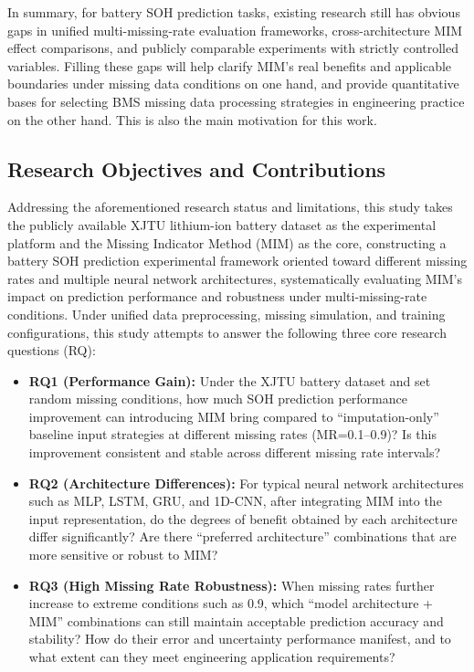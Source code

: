 \documentclass[10pt,a4paper]{article}
\begin{document}
In summary, for battery SOH prediction tasks, existing research still has obvious gaps in unified multi-missing-rate evaluation frameworks, cross-architecture MIM effect comparisons, and publicly comparable experiments with strictly controlled variables. Filling these gaps will help clarify MIM's real benefits and applicable boundaries under missing data conditions on one hand, and provide quantitative bases for selecting BMS missing data processing strategies in engineering practice on the other hand. This is also the main motivation for this work.

\subsection{Research Objectives and Contributions}

Addressing the aforementioned research status and limitations, this study takes the publicly available XJTU lithium-ion battery dataset as the experimental platform and the Missing Indicator Method (MIM) as the core, constructing a battery SOH prediction experimental framework oriented toward different missing rates and multiple neural network architectures, systematically evaluating MIM's impact on prediction performance and robustness under multi-missing-rate conditions. Under unified data preprocessing, missing simulation, and training configurations, this study attempts to answer the following three core research questions (RQ):

\begin{itemize}[leftmargin=2em]
    \item \textbf{RQ1 (Performance Gain):} Under the XJTU battery dataset and set random missing conditions, how much SOH prediction performance improvement can introducing MIM bring compared to ``imputation-only'' baseline input strategies at different missing rates (MR=0.1--0.9)? Is this improvement consistent and stable across different missing rate intervals?
    
    \item \textbf{RQ2 (Architecture Differences):} For typical neural network architectures such as MLP, LSTM, GRU, and 1D-CNN, after integrating MIM into the input representation, do the degrees of benefit obtained by each architecture differ significantly? Are there ``preferred architecture'' combinations that are more sensitive or robust to MIM?
    
    \item \textbf{RQ3 (High Missing Rate Robustness):} When missing rates further increase to extreme conditions such as 0.9, which ``model architecture + MIM'' combinations can still maintain acceptable prediction accuracy and stability? How do their error and uncertainty performance manifest, and to what extent can they meet engineering application requirements?
\end{itemize}
\end{document}

